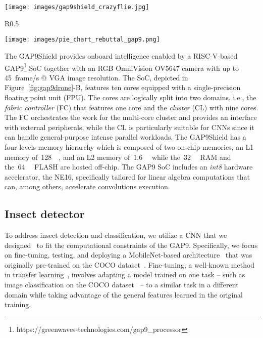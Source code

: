 \begin{figure*}[tb]
\centering
\texttt{[image: images/gap9shield\_crazyflie.jpg]}
\caption{Picture of our nano-UAV prototype (A) and the GAP9Shield block diagram (B).}
\label{fig:gap9drone}
\end{figure*}

\begin{wrapfigure}{R}{0.5\textwidth}
  \begin{center}
    \texttt{[image: images/pie\_chart\_rebuttal\_gap9.png]}
  \end{center}
  \caption{\label{fig:pie_chart_power}Power breakdown of our robotic platform.}
\end{wrapfigure}




The GAP9Shield provides onboard intelligence enabled by a RISC-V-based GAP9\footnote{https://greenwaves-technologies.com/gap9\_processor} SoC together with an RGB OmniVision OV5647 camera with up to \SI{45}{frame/\second} @ VGA image resolution.
The SoC, depicted in Figure~\ref{fig:gap9drone}-B, features ten cores equipped with a single-precision floating point unit (FPU).
The cores are logically split into two domains, i.e., the \textit{fabric controller} (FC) that features one core and the \textit{cluster} (CL) with nine cores. 
The FC orchestrates the work for the multi-core cluster and provides an interface with external peripherals, while the CL is particularly suitable for CNNs since it can handle general-purpose intense parallel workloads.
The GAP9Shield has a four levels memory hierarchy which is composed of two on-chip memories, an L1 memory of~\SI{128}{\kilo\byte}, and an L2 memory of~\SI{1.6}{\mega\byte} while the~\SI{32}{\mega\byte} RAM and the~\SI{64}{\mega\byte} FLASH are hosted off-chip.
The GAP9 SoC includes an \textit{int8} hardware accelerator, the NE16, specifically tailored for linear algebra computations that can, among others, accelerate convolutions execution.

\subsection{Insect detector}

To address insect detection and classification, we utilize a CNN that we designed~\cite{crupi2024deep} to fit the computational constraints of the GAP9. 
Specifically, we focus on fine-tuning, testing, and deploying a MobileNet-based architecture~\cite{howard2019searching} that was originally pre-trained on the COCO dataset~\cite{cocodataset}. 
Fine-tuning, a well-known method in transfer learning~\cite{TransferLearning}, involves adapting a model trained on one task -- such as image classification on the COCO dataset~\cite{cocodataset} -- to a similar task in a different domain while taking advantage of the general features learned in the original training.


